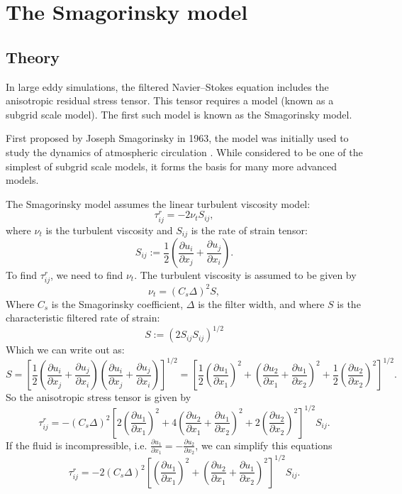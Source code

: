\documentclass[11pt,a4paper]{article}
\begin{document}
\section{The Smagorinsky model}
\subsection{Theory}
In large eddy simulations, the filtered Navier--Stokes equation includes the anisotropic residual stress tensor. This tensor requires a model (known as a subgrid scale model). The first such model is known as the Smagorinsky model.

First proposed by Joseph Smagorinsky in 1963, the model was initially used to study the dynamics of atmospheric circulation \cite{Smagorinsky1963}. While considered to be one of the simplest of subgrid scale models, it forms the basis for many more advanced  models. 

The Smagorinsky model assumes the linear turbulent viscosity model:
$$\tau_{ij}^r = -2\nu_t {S}_{ij},$$
where $\nu_t$ is the turbulent viscosity and $S_{ij}$ is the rate of strain tensor:
$${S}_{ij} := \frac{1}{2}\left( \frac{\partial {u}_i}{\partial x_j} + \frac{\partial {u}_j}{\partial x_i}\right).$$
To find $\tau_{ij}^r$, we need to find $\nu_t$. The turbulent viscosity is assumed to be given by
$$\nu_t = (C_s \Delta)^2 {S},$$
Where $C_s$ is the Smagorinsky coefficient, $\Delta$ is the filter width, and where ${S}$ is the characteristic filtered rate of strain:
$${S} := \left(2{S}_{ij}{S}_{ij}\right)^{1/2}$$
Which we can write out as:
$${S} = \left[\frac{1}{2}\left( \frac{\partial {u}_i}{\partial x_j} + \frac{\partial {u}_j}{\partial x_i}\right)\left( \frac{\partial {u}_i}{\partial x_j} + \frac{\partial {u}_j}{\partial x_i}\right)\right]^{1/2} = \left[\frac{1}{2}\left( \frac{\partial {u}_1}{\partial x_1}\right)^2+\left( \frac{\partial {u}_2}{\partial x_1} + \frac{\partial {u}_1}{\partial x_2}\right)^2+\frac{1}{2}\left( \frac{\partial {u}_2}{\partial x_2}\right)^2 \right]^{1/2}.$$
So the anisotropic stress tensor is given by
\begin{equation}
\tau_{ij}^r = -(C_s \Delta)^2\left[2\left( \frac{\partial {u}_1}{\partial x_1}\right)^2+4\left( \frac{\partial {u}_2}{\partial x_1} + \frac{\partial {u}_1}{\partial x_2}\right)^2+2\left( \frac{\partial {u}_2}{\partial x_2}\right)^2 \right]^{1/2}{S}_{ij}.
\end{equation}
If the fluid is incompressible, i.e. $\frac{\partial {u}_1}{\partial x_1} = -\frac{\partial {u}_2}{\partial x_2}$, we can simplify this equations
\begin{equation}\label{smagTau}
\tau_{ij}^r = -2(C_s \Delta)^2\left[\left( \frac{\partial {u}_1}{\partial x_1}\right)^2+\left( \frac{\partial {u}_2}{\partial x_1} + \frac{\partial {u}_1}{\partial x_2}\right)^2 \right]^{1/2}{S}_{ij}.
\end{equation}
\end{document}

